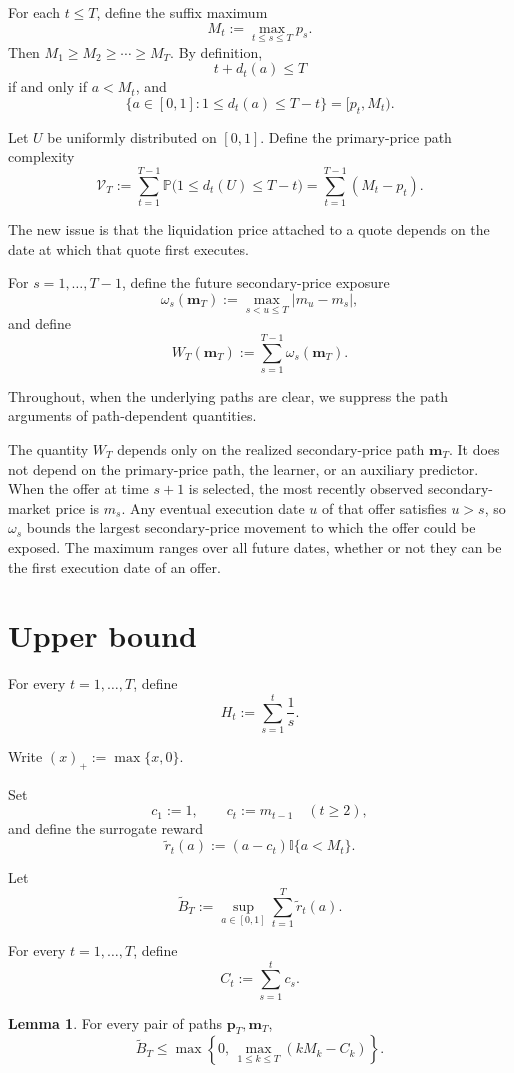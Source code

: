 \documentclass[11pt]{article}
\theoremstyle{definition}
\newtheorem{lemma}{Lemma}
\begin{document}
For each $t\le T$, define the suffix maximum
\[
    M_t:=\max_{t\le s\le T}p_s.
\]
Then $M_1\ge M_2\ge\cdots\ge M_T$. By definition,
\[
    t+d_t(a)\le T
\]
if and only if $a<M_t$, and
\[
    \bigl\{a\in[0,1]:1\le d_t(a)\le T-t\bigr\}=[p_t,M_t).
\]

Let $U$ be uniformly distributed on $[0,1]$. Define the primary-price
path complexity
\[
    \mathcal{V}_T
    :=
    \sum_{t=1}^{T-1}
    \mathbb{P}\bigl(1\le d_t(U)\le T-t\bigr)
    =
    \sum_{t=1}^{T-1}(M_t-p_t).
\]

The new issue is that the liquidation price attached to a quote depends
on the date at which that quote first executes.

For $s=1,\ldots,T-1$, define the future secondary-price exposure
\[
    \omega_s(\boldsymbol{m}_T)
    :=
    \max_{s<u\le T}|m_u-m_s|,
\]
and define
\[
    W_T(\boldsymbol{m}_T)
    :=
    \sum_{s=1}^{T-1}\omega_s(\boldsymbol{m}_T).
\]

Throughout, when the underlying paths are clear, we suppress the path
arguments of path-dependent quantities.

The quantity $W_T$ depends only on the realized secondary-price path
$\boldsymbol{m}_T$. It does not depend on the primary-price path, the
learner, or an auxiliary predictor. When the offer at time $s+1$ is
selected, the most recently observed secondary-market price is $m_s$.
Any eventual execution date $u$ of that offer satisfies $u>s$, so
$\omega_s$ bounds the largest secondary-price movement to which the
offer could be exposed. The maximum ranges over all future dates,
whether or not they can be the first execution date of an offer.

\section{Upper bound}
\label{sec:upper-bound}

For every $t=1,\ldots,T$, define
\[
    H_t:=\sum_{s=1}^t\frac1s.
\]

Write $(x)_+:=\max\{x,0\}$.

Set
\[
    c_1:=1,
    \qquad
    c_t:=m_{t-1}\quad(t\ge2),
\]
and define the surrogate reward
\[
    \widetilde r_t(a):=(a-c_t)\mathbb{I}\{a<M_t\}.
\]

Let
\[
    \widetilde B_T
    :=
    \sup_{a\in[0,1]}
    \sum_{t=1}^T\widetilde r_t(a).
\]

For every $t=1,\ldots,T$, define
\[
    C_t:=\sum_{s=1}^t c_s.
\]

\begin{lemma}
\label{lem:surrogate-benchmark}
For every pair of paths
$\boldsymbol{p}_T,\boldsymbol{m}_T$,
\[
    \widetilde B_T
    \le
    \max\left\{
        0,\,
        \max_{1\le k\le T}(kM_k-C_k)
    \right\}.
\]
\end{lemma}
\end{document}
